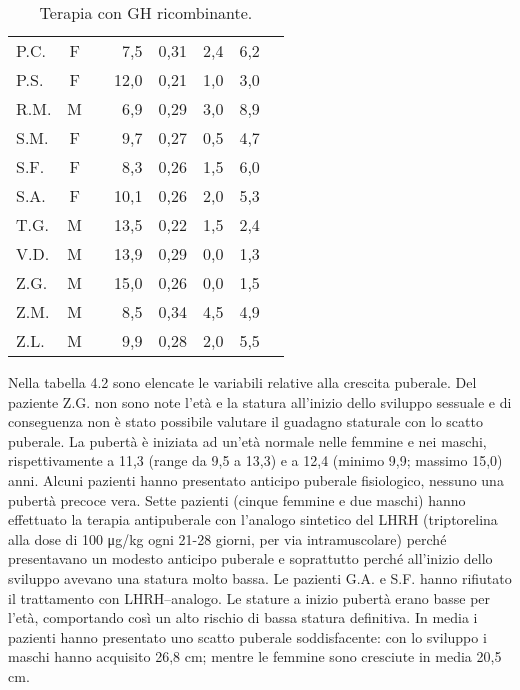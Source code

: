 \begin{table}[!h]
\begin{center}
\begin{tabular}{lccrcccl}
P.C.	& F &  		 & 7,5   	&  0,31     	& 2,4                 & 6,2  \\
P.S.	& F &  		 & 12,0  	&  0,21     	& 1,0                 & 3,0  \\
R.M.	& M & \checkmark & 6,9   	&  0,29     	& 3,0                 & 8,9  \\
S.M.	& F &  	  	 & 9,7   	&  0,27     	& 0,5                 & 4,7  \\
S.F.	& F &  		 & 8,3   	&  0,26     	& 1,5                 & 6,0  \\
S.A.	& F &  		 & 10,1  	&  0,26     	& 2,0                 & 5,3  \\
T.G.    & M &            & 13,5         &  0,22         & 1,5                 & 2,4  \\
V.D.	& M &  		 & 13,9  	&  0,29     	& 0,0                 & 1,3  \\
Z.G.	& M &  		 & 15,0  	&  0,26     	& 0,0                 & 1,5  \\
Z.M.	& M &  		 & 8,5   	&  0,34     	& 4,5                 & 4,9  \\
Z.L.	& M &  		 & 9,9   	&  0,28     	& 2,0                 & 5,5  \\
\bottomrule
\end{tabular}
\end{center}
\caption{Terapia con GH ricombinante.}
\label{tab:Terapia}
\end{table}

Nella tabella 4.2 sono elencate le variabili relative alla crescita puberale. Del paziente Z.G. non sono note l'età e la statura all'inizio dello sviluppo sessuale e di conseguenza non è stato possibile valutare il guadagno staturale con lo scatto puberale.
La pubertà è iniziata ad un'età normale nelle femmine e nei maschi, rispettivamente a 11,3 (range da 9,5 a 13,3) e a 12,4 (minimo 9,9; massimo 15,0) anni. 
Alcuni pazienti hanno presentato anticipo puberale fisiologico, nessuno una pubertà precoce vera. 
Sette pazienti (cinque femmine e due maschi) hanno effettuato la terapia antipuberale con  l'analogo sintetico del LHRH (triptorelina alla dose di 100 \unit{\micro g}/kg ogni 21-28 giorni, per via intramuscolare) perché presentavano un modesto anticipo puberale e soprattutto perché all'inizio dello sviluppo avevano una statura molto bassa. Le pazienti G.A. e S.F. hanno rifiutato il trattamento con LHRH--analogo.
Le stature a inizio pubertà erano basse per l'età, comportando così un alto rischio di bassa statura definitiva.
In media i pazienti hanno presentato uno scatto puberale soddisfacente: con lo sviluppo i maschi hanno acquisito 26,8 cm; mentre le femmine sono cresciute in media 20,5 cm. 
 
